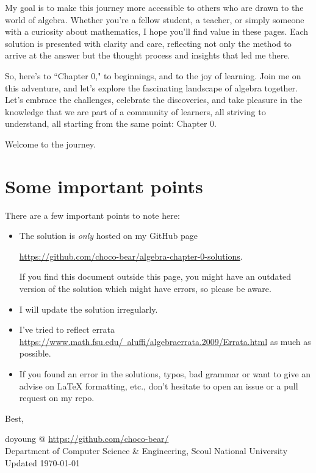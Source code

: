 My goal is to make this journey more accessible to others who are drawn to the world of algebra. Whether you're a fellow student, a teacher, or simply someone with a curiosity about mathematics, I hope you'll find value in these pages. Each solution is presented with clarity and care, reflecting not only the method to arrive at the answer but the thought process and insights that led me there.

So, here's to ``Chapter 0," to beginnings, and to the joy of learning. Join me on this adventure, and let's explore the fascinating landscape of algebra together. Let's embrace the challenges, celebrate the discoveries, and take pleasure in the knowledge that we are part of a community of learners, all striving to understand, all starting from the same point: Chapter 0.

Welcome to the journey.

\newpage
\section*{Some important points}
There are a few important points to note here:
\begin{itemize}
    \item The solution is \emph{only} hosted on my GitHub page
        \begin{center}
		  \href{https://github.com/choco-bear/algebra-chapter-0-solutions}{https://github.com/choco-bear/algebra-chapter-0-solutions}.
        \end{center} 
        If you find this document outside this page, you might have an outdated version of the solution which might have errors, so please be aware.
    \item I will update the solution irregularly.
    \item I've tried to reflect errata \href{https://www.math.fsu.edu/~aluffi/algebraerrata.2009/Errata.html}{https://www.math.fsu.edu/~aluffi/algebraerrata.2009/Errata.html} as much as possible.
    \item If you found an error in the solutions, typos, bad grammar or want to give an advise on LaTeX formatting, etc., don't hesitate to open an issue or a pull request on my repo. 
\end{itemize}

Best,

\begin{flushright}
doyoung @ \href{https://github.com/choco-bear/}{https://github.com/choco-bear/} \\
Department of Computer Science \& Engineering, Seoul National University \\
Updated \specialdate\today
\end{flushright}